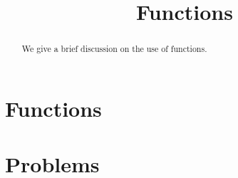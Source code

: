 \documentclass{ximera}
\title{Functions}
\begin{document}
  
\begin{abstract}  
We give a brief discussion on the use of functions.
\end{abstract}  
\maketitle

\section{Functions}



\section{Problems}

\begin{question}
\end{question}

\begin{question}
\end{question}
\end{document}
